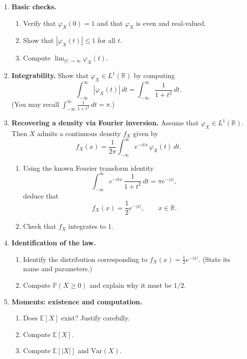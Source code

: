 \documentclass[11pt]{article}
\begin{document}
\begin{enumerate}[leftmargin=*, itemsep=1.2em]
\begin{enumerate}[label=(\alph*)]

\item \textbf{Basic checks.}
\begin{enumerate}[label=(\roman*)]
\item Verify that $\varphi_X(0)=1$ and that $\varphi_X$ is even and real-valued.
\item Show that $|\varphi_X(t)|\le 1$ for all $t$.
\item Compute $\displaystyle \lim_{|t|\to\infty}\varphi_X(t)$.
\end{enumerate}

\medskip

\item \textbf{Integrability.}
Show that $\varphi_X\in L^1(\mathbb{R})$ by computing
\[
\int_{-\infty}^{\infty}\left|\varphi_X(t)\right|\,dt
=
\int_{-\infty}^{\infty}\frac{1}{1+t^2}\,dt.
\]
(You may recall $\int_{-\infty}^{\infty}\frac{1}{1+t^2}\,dt=\pi$.)

\medskip

\item \textbf{Recovering a density via Fourier inversion.}
Assume that $\varphi_X\in L^1(\mathbb{R})$. Then $X$ admits a continuous density $f_X$ given by
\[
f_X(x)=\frac{1}{2\pi}\int_{-\infty}^{\infty} e^{-itx}\,\varphi_X(t)\,dt.
\]
\begin{enumerate}[label=(\roman*)]
\item Using the known Fourier transform identity
\[
\int_{-\infty}^{\infty} e^{-itx}\,\frac{1}{1+t^2}\,dt
= \pi e^{-|x|},
\]
deduce that
\[
f_X(x)=\frac{1}{2}e^{-|x|},\qquad x\in\mathbb{R}.
\]
\item Check that $f_X$ integrates to $1$.
\end{enumerate}

\medskip

\item \textbf{Identification of the law.}
\begin{enumerate}[label=(\roman*)]
\item Identify the distribution corresponding to $f_X(x)=\frac12 e^{-|x|}$.
(State its name and parameters.)
\item Compute $\mathbb{P}(X\ge 0)$ and explain why it must be $1/2$.
\end{enumerate}

\medskip

\item \textbf{Moments: existence and computation.}
\begin{enumerate}[label=(\roman*)]
\item Does $\mathbb{E}[X]$ exist? Justify carefully.
\item Compute $\mathbb{E}[X]$.
\item Compute $\mathbb{E}[|X|]$ and $\mathrm{Var}(X)$.
\end{enumerate}


\end{enumerate}
\end{enumerate}
\end{document}

